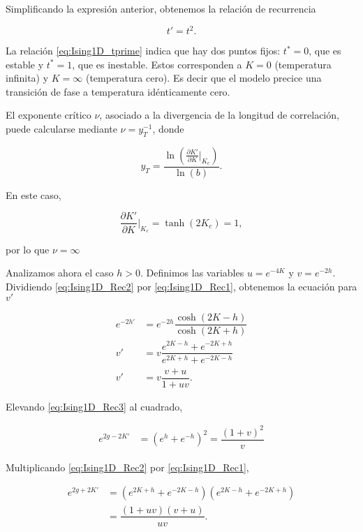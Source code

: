 \documentclass[10pt]{article}
\begin{document}
Simplificando la expresi\'on anterior, obtenemos la relaci\'on de recurrencia

\begin{equation} \label{eq:Ising1D_tprime}
t' = t^2.
\end{equation}

La relaci\'on \ref{eq:Ising1D_tprime} indica que hay dos puntos fijos: $t^*=0$, que es estable y $t^*=1$, que es inestable. Estos corresponden a $K=0$ (temperatura infinita) y $K=\infty$ (temperatura cero). Es decir que el modelo precice una transici\'on de fase a temperatura id\'enticamente cero.

El exponente cr\'itico $\nu$, asociado a la divergencia de la longitud de correlaci\'on, puede calcularse mediante $\nu = y_T^{-1}$, donde 

\begin{equation}
y_T = \dfrac{\ln\left(\frac{\partial K'}{\partial K}\Bigr|_{K_c}\right)}{\ln (b)}.
\end{equation}

En este caso,

\begin{equation}
\frac{\partial K'}{\partial K}\Bigr|_{K_c} = \tanh(2K_c) = 1,
\end{equation}

por lo que $\nu = \infty$

Analizamos ahora el caso $h>0$. Definimos las variables $u=e^{-4K}$ y $v=e^{-2h}$. Dividiendo  \ref{eq:Ising1D_Rec2} por  \ref{eq:Ising1D_Rec1}, obtenemos la ecuaci\'on para $v'$

\begin{align}
e^{-2h'} &= e^{-2h} \dfrac{\cosh(2K-h)}{\cosh(2K+h)} \nonumber \\
v' &= v \dfrac{e^{2K-h} + e^{-2K+h}}{e^{2K+h} + e^{-2K-h}} \nonumber \\
v' &= v \dfrac{v+u}{1+uv}.
\end{align}

Elevando \ref{eq:Ising1D_Rec3} al cuadrado,

\begin{align}\label{eq:Ising1D_Rec4}
e^{2g-2K'} &= (e^h + e^{-h})^2 = \dfrac{(1+v)^2}{v} 
\end{align}

Multiplicando \ref{eq:Ising1D_Rec2} por  \ref{eq:Ising1D_Rec1},

\begin{align}
e^{2g+2K'} &= (e^{2K+h} + e^{-2K-h}) (e^{2K-h} + e^{-2K+h}) \nonumber \\
&= \dfrac{(1+uv)(v+u)}{uv}. \label{eq:Ising1D_Rec5}
\end{align}
\end{document}
